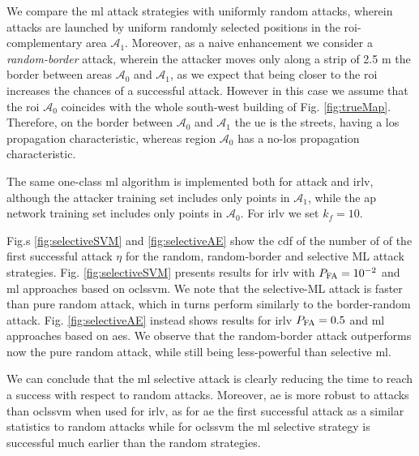 \documentclass[draftcls,onecolumn,12pt]{IEEEtran}
\begin{document}

We compare the \ac{ml} attack strategies with uniformly random attacks, wherein attacks are launched by uniform randomly selected positions in the \ac{roi}-complementary area $\mathcal{A}_1$.  Moreover, as a naive enhancement we consider a \emph{random-border} attack, wherein the attacker moves only along a strip of 2.5 m the border between areas $\mathcal{A}_0$ and $\mathcal A_1$, as we expect that being closer to the \ac{roi} increases the chances of a successful attack. However in this case we assume that the \ac{roi} $\mathcal A_0$ coincides with the whole south-west building of Fig. \ref{fig:trueMap}. Therefore, on the border between $\mathcal A_0$ and $\mathcal A_1$ the \ac{ue} is the streets, having a \ac{los} propagation characteristic, whereas region $\mathcal A_0$ has a no-\ac{los} propagation characteristic. 

The same one-class \ac{ml} algorithm is implemented both for attack and \ac{irlv}, although the attacker training set includes only points in $\mathcal A_1$, while the \ac{ap} network training set includes only  points in $\mathcal A_0$. For  \ac{irlv}  we set $k_f=10$.

Fig.s \ref{fig:selectiveSVM} and \ref{fig:selectiveAE} show the \ac{cdf} of the number of of the first successful attack $\eta$ for the random, random-border and selective ML attack strategies. Fig. \ref{fig:selectiveSVM} presents results for \ac{irlv} with $P_{\rm FA}=10^{-2}$ and \ac{ml} approaches based on \ac{oclssvm}. We note that the selective-ML attack is faster than pure random attack, which in turns perform similarly to the border-random  attack.  Fig. \ref{fig:selectiveAE} instead shows results for  \ac{irlv} $P_{\rm FA} =0.5$ and \ac{ml} approaches based on \acp{ae}. We observe that the random-border attack outperforms now the pure random attack, while still being less-powerful than selective \ac{ml}. 

We can conclude that the \ac{ml} selective attack is clearly reducing the time to reach a success with respect to random attacks. Moreover, \ac{ae} is more robust to attacks than \ac{oclssvm} when used for \ac{irlv}, as for \ac{ae} the first successful attack as a similar statistics to random attacks while for \ac{oclssvm} the \ac{ml} selective strategy is  successful much earlier than the random strategies. 
\end{document}
